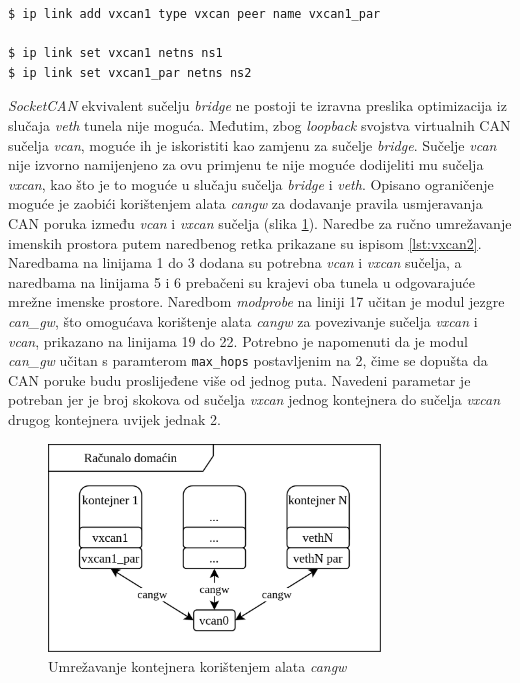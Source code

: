 \documentclass[times, utf8, diplomski, numeric]{fer}
\begin{document}
\bigskip
\begin{lstlisting}[style=terminal, label={lst:vxcan1},caption={Povezivanje mrežnih imenskih prostora \textit{vxcan} tunelom}]
$ ip link add vxcan1 type vxcan peer name vxcan1_par

$ ip link set vxcan1 netns ns1
$ ip link set vxcan1_par netns ns2
\end{lstlisting}


\textit{SocketCAN} ekvivalent sučelju \textit{bridge} ne postoji te izravna preslika optimizacija iz slučaja \textit{veth} tunela nije moguća. Međutim, zbog \textit{loopback} svojstva virtualnih CAN sučelja \textit{vcan}, moguće ih je iskoristiti kao zamjenu za sučelje \textit{bridge}. Sučelje \textit{vcan} nije izvorno namijenjeno za ovu primjenu te nije moguće dodijeliti mu sučelja \textit{vxcan}, kao što je to moguće u slučaju sučelja \textit{bridge} i \textit{veth}. Opisano ograničenje moguće je zaobići korištenjem alata \textit{cangw} za dodavanje pravila usmjeravanja CAN poruka između \textit{vcan} i \textit{vxcan} sučelja (slika \ref{fig:vcanb}). Naredbe za ručno umrežavanje imenskih prostora putem naredbenog retka prikazane su ispisom \ref{lst:vxcan2}. Naredbama na linijama 1 do 3 dodana su potrebna \textit{vcan} i \textit{vxcan} sučelja, a naredbama na linijama 5 i 6 prebačeni su krajevi oba tunela u odgovarajuće mrežne imenske prostore. Naredbom \textit{modprobe} na liniji 17 učitan je modul jezgre \textit{can\_gw}, što omogućava korištenje alata \textit{cangw} za povezivanje sučelja \textit{vxcan} i \textit{vcan}, prikazano na linijama 19 do 22. 
Potrebno je napomenuti da je modul \textit{can\_gw} učitan s paramterom \texttt{max\_hops} postavljenim na 2, čime se dopušta da CAN poruke budu proslijeđene više od jednog puta. Navedeni parametar je potreban jer je broj skokova od sučelja \textit{vxcan} jednog kontejnera do sučelja \textit{vxcan}  drugog kontejnera uvijek jednak 2.
\begin{figure}[htb]
\centering
\includegraphics[width=250pt]{vcan_bridge.png}
\caption{Umrežavanje kontejnera korištenjem alata \textit{cangw}}
\label{fig:vcanb}
\end{figure}
\end{document}
